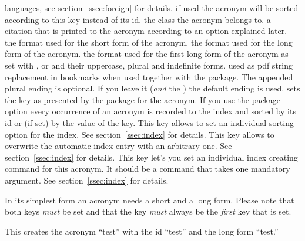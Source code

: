 \documentclass[load-preamble+]{cnltx-doc}
\begin{document}
\begin{options}
    languages, see section~\ref{ssec:foreign} for details.
    if used the acronym will be sorted according to this key instead of its
    \acs{id}.
    the class the acronym belongs to.
    a citation that is printed to the acronym according to an option explained
    later.
    the format used for the short form of the acronym.
    the format used for the long form of the acronym.
    the format used for the first long form of the acronym as set with ,
     or  and their uppercase, plural and indefinite forms.
    used as \acs{pdf} string replacement in bookmarks when used together with the
     package.  The appended plural ending is optional.  If you
   leave it (\emph{and} the \code{/}) the default ending is used.
    sets the  key as presented by the  package
    for the acronym.
    If you use the package option  every
    occurrence of an acronym is recorded to the index and sorted by its
    \ac{id} or (if set) by the value of the  key.  This key
    allows to set an individual sorting option for the index.  See
    section~\ref{ssec:index} for details.
    This key allows to overwrite the automatic index entry
    with an arbitrary one.  See section~\ref{ssec:index} for details.
    This key let's you set an individual index creating
    command for this acronym.  It should be a command that takes one mandatory
    argument.  See section~\ref{ssec:index} for details.
\end{options}

In its simplest form an acronym needs a short and a long form.  Please note
that both keys \emph{must} be set and that the  key \emph{must}
always be the \emph{first} key that is set.
\begin{sourcecode}
\end{sourcecode}
This creates the acronym ``\acs{test}'' with the \acs{id} ``test'' and the
long form ``\acl{test}.''
\end{document}
